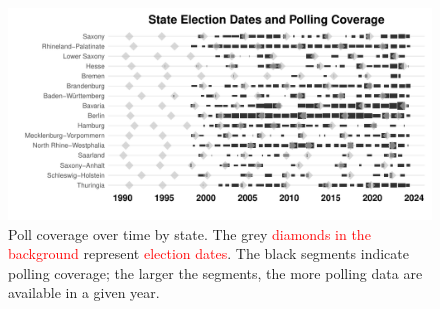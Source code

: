 \documentclass[12pt]{article}
\begin{document}
\begin{doublespacing}
\begin{figure}[t]
    \centering
    \includegraphics[width=\textwidth]{fg2_polls_coverage_density.pdf}  
    \caption{Poll coverage over time by state. The grey \textcolor{red}{diamonds in the background} represent \textcolor{red}{election dates}. The black segments indicate polling coverage; the larger the segments, the more polling data are available in a given year.}
    \label{fig:polls-coverage}
\end{figure}



\end{doublespacing}
\end{document}
